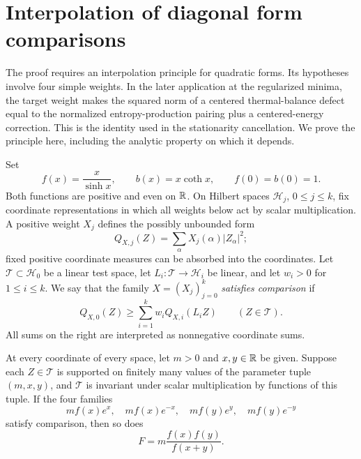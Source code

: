 \section{Interpolation of diagonal form comparisons}\label{sec:interpolation}

The proof requires an interpolation principle for quadratic forms. Its
hypotheses involve four simple weights. In the later application at the
regularized minima, the target weight makes the squared norm of a centered
thermal-balance defect equal to the normalized entropy-production pairing
plus a centered-energy correction. This is the identity used in the
stationarity cancellation. We prove the principle here, including the
analytic property on which it depends.

Set
\begin{equation}\label{int:fb}
 f(x)=\frac{x}{\sinh x},\qquad b(x)=x\coth x,\qquad f(0)=b(0)=1.
\end{equation}
Both functions are positive and even on $\mathbb R$.  On Hilbert spaces
$\mathcal H_j$, $0\le j\le k$, fix coordinate representations in which all
weights below act by scalar multiplication.  A positive weight $X_j$
defines the possibly unbounded form
\[
 Q_{X,j}(Z)=\sum_{\alpha}X_j(\alpha)|Z_\alpha|^2;
\]
fixed positive coordinate measures can be absorbed into the coordinates.
Let $\mathcal T\subset\mathcal H_0$ be a linear test space, let
$L_i:\mathcal T\to\mathcal H_i$ be linear, and let $w_i>0$ for $1\le i\le k$.
We say that the family $X=(X_j)_{j=0}^k$ \emph{satisfies comparison} if
\begin{equation}\label{int:comparison}
 Q_{X,0}(Z)\ge\sum_{i=1}^k w_i Q_{X,i}(L_iZ)
 \qquad(Z\in\mathcal T).
\end{equation}
All sums on the right are interpreted as nonnegative coordinate sums.

\begin{theorem}\label{thm:interpolation}
At every coordinate of every space, let $m>0$ and $x,y\in\mathbb R$ be given.
Suppose each $Z\in\mathcal T$ is supported on finitely many values of the
parameter tuple $(m,x,y)$, and $\mathcal T$ is invariant under scalar
multiplication by functions of this tuple.  If the four families
\begin{equation}\label{int:four-weights}
 mf(x)e^x,\quad mf(x)e^{-x},\quad mf(y)e^y,\quad mf(y)e^{-y}
\end{equation}
satisfy comparison, then so does
\begin{equation}\label{int:target-weight}
 F=m\frac{f(x)f(y)}{f(x+y)}.
\end{equation}
\end{theorem}

